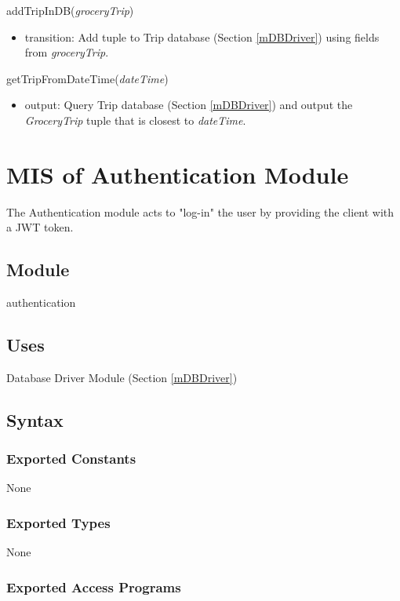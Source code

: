 \documentclass[12pt, titlepage]{article}
\begin{document}
\noindent addTripInDB(\textit{groceryTrip})
\begin{itemize}
\item transition: Add tuple to Trip database (Section \ref{mDBDriver}) using fields from \textit{groceryTrip}.
\end{itemize}

\noindent getTripFromDateTime(\textit{dateTime})
\begin{itemize}
\item output: Query Trip database (Section \ref{mDBDriver}) and output the \textit{GroceryTrip} tuple that is closest to \textit{dateTime}.
\end{itemize}

\newpage

\section{MIS of Authentication Module} \label{mAuthentication} 
The Authentication module acts to "log-in" the user by providing the client with a JWT token.

\subsection{Module}

authentication

\subsection{Uses}

Database Driver Module (Section \ref{mDBDriver}) 

\subsection{Syntax}

\subsubsection{Exported Constants}

None

\subsubsection{Exported Types}

None

\subsubsection{Exported Access Programs}
\end{document}
